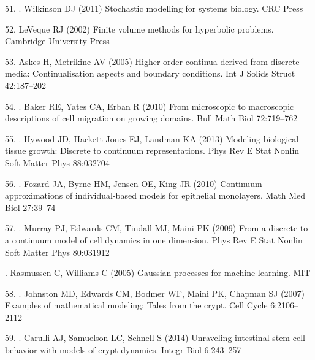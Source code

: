 \documentclass[10pt,letterpaper]{article}
\providecommand{\DIFaddtex}[1]{{\protect\color{blue} \sf #1}} %
\providecommand{\DIFdeltex}[1]{{\protect\color{red} \scriptsize #1}} %
\providecommand{\DIFaddbegin}{} %
\providecommand{\DIFaddend}{} %
\providecommand{\DIFdelbegin}{} %
\providecommand{\DIFdelend}{} %
\providecommand{\DIFadd}[1]{\texorpdfstring{\DIFaddtex{#1}}{#1}} %
\providecommand{\DIFdel}[1]{\texorpdfstring{\DIFdeltex{#1}}{}} %
\begin{document}
\DIFdelend \hypertarget{ref-Wilkinson2011-wh}{}
\DIFdelbegin \DIFdel{51. }\DIFdelend \DIFaddbegin \DIFadd{45. }\DIFaddend Wilkinson DJ (2011) Stochastic modelling for systems biology. CRC
Press

\DIFdelbegin %
\DIFdel{52. LeVeque RJ (2002) Finite volume methods for hyperbolic problems.
Cambridge University Press
}%

\DIFdel{53. Askes H, Metrikine AV (2005) Higher-order continua derived from
discrete media: Continualisation aspects and boundary conditions. Int J
Solids Struct 42:187--202
}%

\DIFdelend \hypertarget{ref-Baker2010-ne}{}
\DIFdelbegin \DIFdel{54. }\DIFdelend \DIFaddbegin \DIFadd{46. }\DIFaddend Baker RE, Yates CA, Erban R (2010) From microscopic to macroscopic
descriptions of cell migration on growing domains. Bull Math Biol
72:719--762

\hypertarget{ref-Hywood2013-zf}{}
\DIFdelbegin \DIFdel{55. }\DIFdelend \DIFaddbegin \DIFadd{47. }\DIFaddend Hywood JD, Hackett-Jones EJ, Landman KA (2013) Modeling biological
tissue growth: Discrete to continuum representations. Phys Rev E Stat
Nonlin Soft Matter Phys 88:032704

\hypertarget{ref-Fozard2010-hd}{}
\DIFdelbegin \DIFdel{56. }\DIFdelend \DIFaddbegin \DIFadd{48. }\DIFaddend Fozard JA, Byrne HM, Jensen OE, King JR (2010) Continuum
approximations of individual-based models for epithelial monolayers.
Math Med Biol 27:39--74

\hypertarget{ref-Murray2009-zg}{}
\DIFdelbegin \DIFdel{57. }\DIFdelend \DIFaddbegin \DIFadd{49. }\DIFaddend Murray PJ, Edwards CM, Tindall MJ, Maini PK (2009) From a discrete
to a continuum model of cell dynamics in one dimension. Phys Rev E Stat
Nonlin Soft Matter Phys 80:031912

\DIFaddbegin \hypertarget{ref-Rasmussen2005-ef}{}
\DIFadd{50. Rasmussen C, Williams C (2005) Gaussian processes for machine
learning. MIT
}

\DIFaddend \hypertarget{ref-Johnston2007-pq}{}
\DIFdelbegin \DIFdel{58. }\DIFdelend \DIFaddbegin \DIFadd{51. }\DIFaddend Johnston MD, Edwards CM, Bodmer WF, Maini PK, Chapman SJ (2007)
Examples of mathematical modeling: Tales from the crypt. Cell Cycle
6:2106--2112

\hypertarget{ref-Carulli2014-bd}{}
\DIFdelbegin \DIFdel{59. }\DIFdelend \DIFaddbegin \DIFadd{52. }\DIFaddend Carulli AJ, Samuelson LC, Schnell S (2014) Unraveling intestinal
stem cell behavior with models of crypt dynamics. Integr Biol 6:243--257
\end{document}
